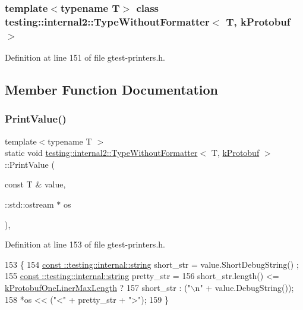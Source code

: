 \subsubsection*{template$<$typename T$>$\newline
class testing\+::internal2\+::\+Type\+Without\+Formatter$<$ T, k\+Protobuf $>$}



Definition at line 151 of file gtest-\/printers.\+h.



\subsection{Member Function Documentation}
\mbox{\label{classtesting_1_1internal2_1_1TypeWithoutFormatter_3_01T_00_01kProtobuf_01_4_ac96fb775dc776f02da9a671ea0e04599}} 
\subsubsection{\texorpdfstring{Print\+Value()}{PrintValue()}}
{\footnotesize\ttfamily template$<$typename T $>$ \\
static void \hyperlink{classtesting_1_1internal2_1_1TypeWithoutFormatter}{testing\+::internal2\+::\+Type\+Without\+Formatter}$<$ T, \hyperlink{namespacetesting_1_1internal2_aeb8161b0b3ee503347b0662d7028fd57a14aaf98a2547ecf43eef0868d54b1383}{k\+Protobuf} $>$\+::Print\+Value (\begin{DoxyParamCaption}\item[{const T \&}]{value,  }\item[{\+::std\+::ostream $\ast$}]{os }\end{DoxyParamCaption})\hspace{0.3cm}{\ttfamily [inline]}, {\ttfamily [static]}}



Definition at line 153 of file gtest-\/printers.\+h.


\begin{DoxyCode}
153                                                          \{
154     \hyperlink{namespacetesting_1_1internal_a8e8ff5b11e64078831112677156cb111}{const ::testing::internal::string} short\_str = value.ShortDebugString()
      ;
155     \hyperlink{namespacetesting_1_1internal_a8e8ff5b11e64078831112677156cb111}{const ::testing::internal::string} pretty\_str =
156         short\_str.length() <= \hyperlink{namespacetesting_1_1internal2_a140c8efd51e63a3def98445bff107518}{kProtobufOneLinerMaxLength} ?
157         short\_str : (\textcolor{stringliteral}{"\(\backslash\)n"} + value.DebugString());
158     *os << (\textcolor{stringliteral}{"<"} + pretty\_str + \textcolor{stringliteral}{">"});
159   \}
\end{DoxyCode}


